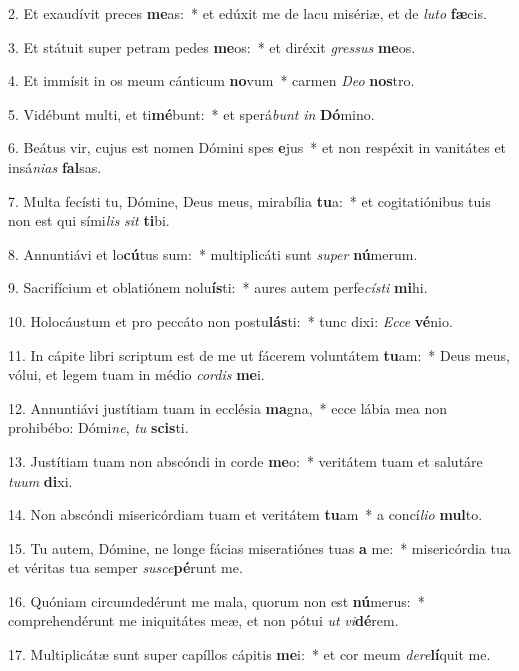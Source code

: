 2. Et exaudívit preces \textbf{me}as:~*  et edúxit me de lacu misériæ, et de \textit{lu}\textit{to} \textbf{fæ}cis.\

3. Et státuit super petram pedes \textbf{me}os:~*  et diréxit \textit{gres}\textit{sus} \textbf{me}os.\

4. Et immísit in os meum cánticum \textbf{no}vum~*  carmen \textit{De}\textit{o} \textbf{nos}tro.\

5. Vidébunt multi, et ti\textbf{mé}bunt:~*  et sperá\textit{bunt} \textit{in} \textbf{Dó}mino.\

6. Beátus vir, cujus est nomen Dómini spes \textbf{e}jus~*  et non respéxit in vanitátes et insá\textit{ni}\textit{as} \textbf{fal}sas.\

7. Multa fecísti tu, Dómine, Deus meus, mirabília \textbf{tu}a:~*  et cogitatiónibus tuis non est qui sími\textit{lis} \textit{sit} \textbf{ti}bi.\

8. Annuntiávi et lo\textbf{cú}tus sum:~*  multiplicáti sunt \textit{su}\textit{per} \textbf{nú}merum.\

9. Sacrifícium et oblatiónem nolu\textbf{ís}ti:~*  aures autem perfe\textit{cís}\textit{ti} \textbf{mi}hi.\

10. Holocáustum et pro peccáto non postu\textbf{lás}ti:~*  tunc dixi: \textit{Ec}\textit{ce} \textbf{vé}nio.\

11. In cápite libri scriptum est de me ut fácerem voluntátem \textbf{tu}am:~*  Deus meus, vólui, et legem tuam in médio \textit{cor}\textit{dis} \textbf{me}i.\

12. Annuntiávi justítiam tuam in ecclésia \textbf{ma}gna,~*  ecce lábia mea non prohibébo: Dómi\textit{ne}, \textit{tu} \textbf{scis}ti.\

13. Justítiam tuam non abscóndi in corde \textbf{me}o:~*  veritátem tuam et salutáre \textit{tu}\textit{um} \textbf{di}xi.\

14. Non abscóndi misericórdiam tuam et veritátem \textbf{tu}am~*  a concí\textit{li}\textit{o} \textbf{mul}to.\

15. Tu autem, Dómine, ne longe fácias miseratiónes tuas \textbf{a} me:~*  misericórdia tua et véritas tua semper \textit{su}\textit{sce}\textbf{pé}runt me.\

16. Quóniam circumdedérunt me mala, quorum non est \textbf{nú}merus:~*  comprehendérunt me iniquitátes meæ, et non pótui \textit{ut} \textit{vi}\textbf{dé}rem.\

17. Multiplicátæ sunt super capíllos cápitis \textbf{me}i:~*  et cor meum \textit{de}\textit{re}\textbf{lí}quit me.\

